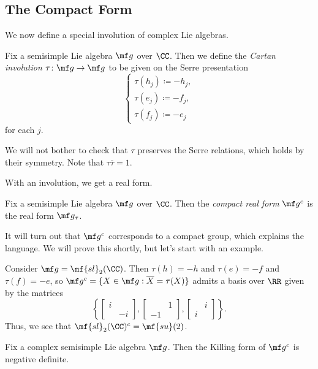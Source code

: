 \documentclass[../notes.tex]{subfiles}
\begin{document}
\subsection{The Compact Form}
We now define a special involution of complex Lie algebras.
\begin{definition}
	Fix a semisimple Lie algebra $\mf g$ over $\CC$. Then we define the \textit{Cartan involution} $\tau\colon\mf g\to\mf g$ to be given on the Serre presentation
	\[\begin{cases}
		\tau(h_j)\coloneqq-h_j, \\
		\tau(e_j)\coloneqq-f_j, \\
		\tau(f_j)\coloneqq-e_j
	\end{cases}\]
	for each $j$.
\end{definition}
\begin{remark}
	We will not bother to check that $\tau$ preserves the Serre relations, which holds by their symmetry. Note that $\tau\overline\tau=1$.
\end{remark}
With an involution, we get a real form.
\begin{definition}
	Fix a semisimple Lie algebra $\mf g$ over $\CC$. Then the \textit{compact real form} $\mf g^c$ is the real form $\mf g_\tau$.
\end{definition}
It will turn out that $\mf g^c$ corresponds to a compact group, which explains the language. We will prove this shortly, but let's start with an example.
\begin{example} \label{ex:compact-sl2}
	Consider $\mf g=\mf{sl}_{2}(\CC)$. Then $\tau(h)=-h$ and $\tau(e)=-f$ and $\tau(f)=-e$, so $\mf g^c=\{X\in\mf g:\overline X=\tau(X)\}$ admits a basis over $\RR$ given by the matrices
	\[\left\{\begin{bmatrix}
		i \\ & -i
	\end{bmatrix},\begin{bmatrix}
		& 1 \\ -1
	\end{bmatrix},\begin{bmatrix}
		& i \\ i
	\end{bmatrix}\right\}.\]
	Thus, we see that $\mf{sl}_2(\CC)^c=\mf{su}(2)$.
\end{example}
\begin{theorem} \label{thm:compact-form-compact}
	Fix a complex semisimple Lie algebra $\mf g$. Then the Killing form of $\mf g^c$ is negative definite.
\end{theorem}
\end{document}
